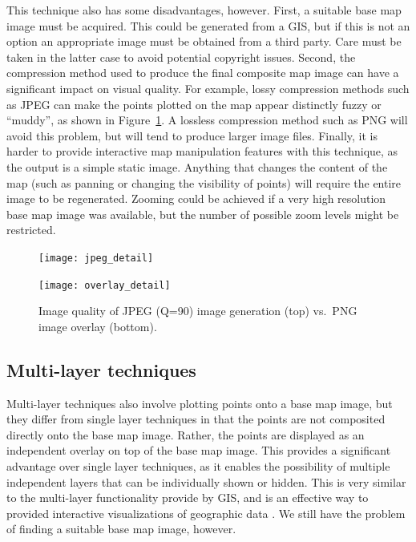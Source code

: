 \documentclass[acmtocl,acmnow]{acmtrans2m}
\begin{document}
This technique also has some disadvantages, however. First, a suitable
base map image must be acquired. This could be generated from a GIS, but
if this is not an option an appropriate image must be obtained from a
third party. Care must be taken in the latter case to avoid potential
copyright issues. Second, the compression method used to produce the
final composite map image can have a significant impact on visual
quality. For example, lossy compression methods such as JPEG can make
the points plotted on the map appear distinctly fuzzy or ``muddy'', as
shown in Figure~\ref{fig-image-quality}. A lossless compression method
such as PNG will avoid this problem, but will tend to produce larger
image files. Finally, it is harder to provide interactive map
manipulation features with this technique, as the output is a simple
static image. Anything that changes the content of the map (such as
panning or changing the visibility of points) will require the entire
image to be regenerated. Zooming could be achieved if a very high
resolution base map image was available, but the number of possible zoom
levels might be restricted.


\begin{figure}
	\centering
	\texttt{[image: jpeg\_detail]}\medskip
	
	\texttt{[image: overlay\_detail]}
	\caption{Image quality of JPEG (Q=90) image generation (top) vs.\
	PNG image overlay (bottom).}
	\label{fig-image-quality}
\end{figure}


\subsection{Multi-layer techniques}
\label{sec-overlay}


Multi-layer techniques also involve plotting points onto a base map image,
but they differ from single layer techniques in that the points are
not composited directly onto the base map image. Rather, the points are
displayed as an independent overlay on top of the base map image. This
provides a significant advantage over single layer techniques, as it
enables the possibility of multiple independent layers that can be
individually shown or hidden. This is very similar to the multi-layer
functionality provide by GIS, and is an effective way to provided
interactive visualizations of geographic data
\cite{Wood-J-1996-vis,MacE-AM-1998-GIS}. We still have the problem of
finding a suitable base map image, however.
\end{document}
